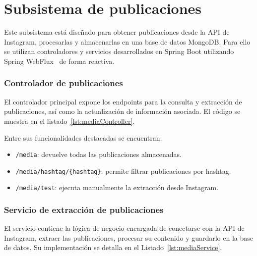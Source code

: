 \section{Subsistema de publicaciones}
Este subsistema está diseñado para obtener publicaciones desde la API de Instagram, procesarlas y almacenarlas en una base de datos MongoDB. Para ello se utilizan controladores y servicios desarrollados en Spring Boot utilizando Spring WebFlux~\cite{webflux} de forma reactiva.

\subsubsection{Controlador de publicaciones}

El controlador principal expone los endpoints para la consulta y extracción de publicaciones, así como la actualización de información asociada. El código se muestra en el listado~\ref{lst:mediaController}.


Entre sus funcionalidades destacadas se encuentran:

\begin{itemize}
    \item \texttt{/media}: devuelve todas las publicaciones almacenadas.
    \item \texttt{/media/hashtag/\{hashtag\}}: permite filtrar publicaciones por hashtag.
    \item \texttt{/media/test}: ejecuta manualmente la extracción desde Instagram.
\end{itemize}

\subsubsection{Servicio de extracción de publicaciones}

El servicio contiene la lógica de negocio encargada de conectarse con la API de Instagram, extraer las publicaciones, procesar su contenido y guardarlo en la base de datos. Su implementación se detalla en el Listado~\ref{lst:mediaService}.

